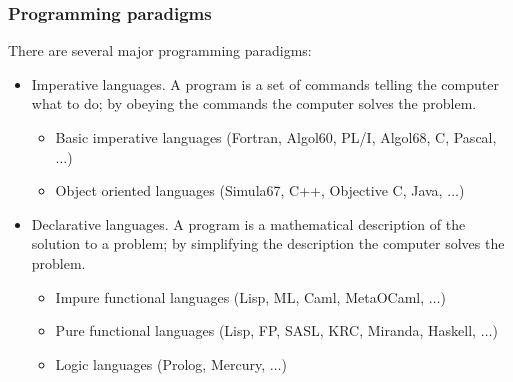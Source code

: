 \documentclass{beamer}
\begin{document}
\begin{frame}
\frametitle{Programming paradigms}

There are several major programming paradigms:

\begin{itemize}
\item {\bluetext Imperative languages.}  A program is a set of
  commands telling the computer what to do; by obeying the commands
  the computer solves the problem.
  \begin{itemize}
  \item {\bluetext Basic imperative languages} {\redtext (Fortran,
      Algol60, PL/I, Algol68, C, Pascal, $\ldots$)}
  \item {\bluetext Object oriented languages} {\redtext (Simula67,
      C++, Objective C, Java, $\ldots$)}
  \end{itemize}
\item {\bluetext Declarative languages.}  A program is a
  mathematical description of the solution to a problem; by
  simplifying the description the computer solves the problem.
  \begin{itemize}
  \item {\bluetext Impure functional languages} {\redtext (Lisp,
      ML, Caml, MetaOCaml, $\dots$)}
  \item {\bluetext Pure functional languages} {\redtext (Lisp, FP,
      SASL, KRC, Miranda, Haskell, $\dots$)}
  \item {\bluetext Logic languages} {\redtext (Prolog, Mercury,
      $\ldots$)}
  \end{itemize}
\end{itemize}

\end{frame}
\end{document}
